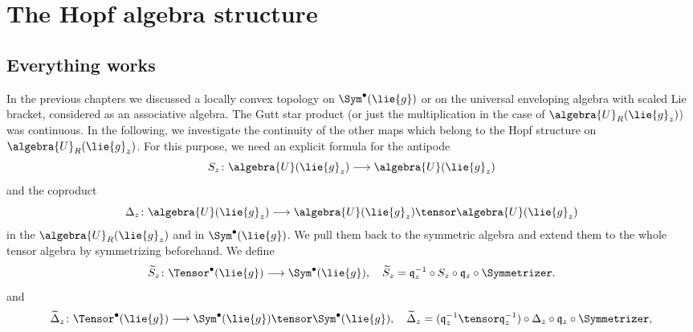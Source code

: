 
%
%

\chapter{The Hopf algebra structure}

\section{Everything works}

In the previous chapters we discussed a locally convex topology on $\Sym^{\bullet}
(\lie{g})$ or on the universal enveloping algebra with scaled Lie bracket, 
considered as an associative algebra. The Gutt star product (or just the 
multiplication in the case of $\algebra{U}_R(\lie{g}_z)$) was continuous.
In the following, we investigate the continuity of the other maps which belong to 
the Hopf structure on $\algebra{U}_R(\lie{g}_z)$. For this purpose, we need an 
explicit formula for the antipode
\begin{equation}
    \label{eq:Antipode}
    S_z \colon
    \algebra{U}(\lie{g}_z)
    \longrightarrow
    \algebra{U}(\lie{g}_z)
\end{equation}
and the coproduct
\begin{equation}
    \label{eq:CoProduct}
    \coproduct_z \colon
    \algebra{U}(\lie{g}_z)
    \longrightarrow
    \algebra{U}(\lie{g}_z)
    \tensor
    \algebra{U}(\lie{g}_z)
\end{equation}
in the $\algebra{U}_R(\lie{g}_z)$ and in $\Sym^{\bullet}(\lie{g})$. We pull them 
back to the symmetric algebra and extend them to the whole tensor algebra by 
symmetrizing beforehand. We define
\begin{equation}
    \label{eq:AntipodeOnTensor}
    \widetilde{S}_z \colon
    \Tensor^\bullet(\lie{g})
    \longrightarrow
    \Sym^\bullet(\lie{g})
    , \quad
    \widetilde{S}_z
    =
    \mathfrak{q}_z^{-1}
    \circ
    S_z
    \circ
    \mathfrak{q}_z
    \circ
    \Symmetrizer.
\end{equation}
and
\begin{equation}
    \label{eq:CoProductOnTensor}
    \widetilde{\ocoproduct}_z \colon
    \Tensor^\bullet(\lie{g})
    \longrightarrow
    \Sym^\bullet(\lie{g})
    \tensor
    \Sym^\bullet(\lie{g})
    , \quad
    \widetilde{\ocoproduct}_z
    =
    (\mathfrak{q}_z^{-1} \tensor \mathfrak{q}_z^{-1})
    \circ
    \coproduct_z
    \circ
    \mathfrak{q}_z
    \circ
    \Symmetrizer,
\end{equation}
